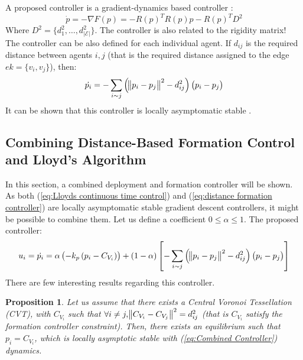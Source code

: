\documentclass{iacas}
\newtheorem{proposition}{Proposition}
\begin{document}
A proposed controller is a gradient-dynamics based controller \cite{Kwang-KyoOh2011,Krick2008}:
\begin{equation}
\dot{p} = -\nabla F(p) = -R(p)^{T} R(p) p - R(p)^{T}D^2
\label{eq:distance formation controller}
\end{equation}
Where $D^2 = \{d_1^2, \ldots, d_{|\mathcal{E}|}^2\}$. The controller is also related to the rigidity matrix!\\
The controller can be also defined for each individual agent. If $d_{ij}$ is the required distance between agents $i,j$ (that is the required distance assigned to the edge $ek = \{v_i, v_j\}$), then:
\begin{equation}
    \dot{p_{i}} = -\sum_{i \sim j} \left( \norm{p_{i} - p_{j}}^{2} - d_{ij}^2 \right) \left( p_{i} - p_{j} \right)
    \label{eq:distance formation controller for individual agent}
\end{equation}
It can be shown that this controller is locally asymptomatic stable \cite{Kwang-KyoOh2011,Krick2008}.

\subsection{Combining Distance-Based Formation Control and Lloyd's Algorithm}
In this section, a combined deployment and formation controller will be shown. As both (\ref{eq:Lloyds continuous time control}) and (\ref{eq:distance formation controller}) are locally asymptomatic stable gradient descent controllers, it might be possible to combine them. Let us define a coefficient $0 \leq \alpha \leq 1$. The proposed controller:
\begin{equation}
    u_{i} = \dot{p_{i}} = \alpha \left(-k_{p}\left( p_i -C_{V_{i}} \right)\right) +
    \left( 1-\alpha \right)\left[-\sum_{i \sim j} \left( \norm{p_{i} - p_{j}}^{2} - d_{ij}^2 \right) \left( p_{i} - p_{j} \right)  \right] 
    \label{eq:Combined Controller}
\end{equation}
There are few interesting results regarding this controller.

\begin{proposition}
    Let us assume that there exists a Central Voronoi Tessellation (CVT), with $C_{V_{i}}$ such that $\forall i \neq j, \norm{C_{V_{i}} - C_{V_{j}}}^{2} = d_{ij}^{2}$ (that is $C_{V_{i}}$ satisfy the formation controller constraint). Then, there exists an equilibrium such that $p_{i} = C_{V_{i}}$, which is locally asymptotic stable with (\ref{eq:Combined Controller}) dynamics.
    \label{proposition 1}
\end{proposition}
\end{document}
